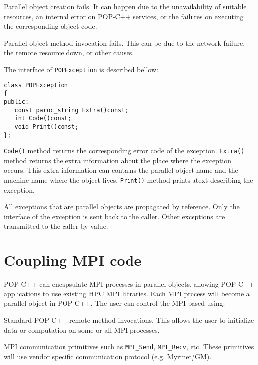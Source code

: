 \begin{petitem}

\item Parallel object creation fails. It can happen due to the
      unavailability of suitable resources, an internal error on POP-C++
      services, or the failures on executing the corresponding object
      code.

\item Parallel object method invocation fails. This can be due to the network
      failure, the remote resource down, or other causes.

\end{petitem}

The interface of \texttt{POPException} is described bellow:

\begin{verbatim}
class POPException
{
public:
   const paroc_string Extra()const;
   int Code()const;
   void Print()const;
};
\end{verbatim}

\texttt{Code()} method returns the corresponding error code of the exception.
\texttt{Extra()} method returns the extra information about the place where the
exception occurs. This extra information can contains the parallel object name
and the machine name where the object lives.
\texttt{Print()} method prints atext describing the exception.

All exceptions that are parallel objects are propagated by reference.
Only the interface of the exception is sent back to the caller. Other
exceptions are transmitted to the caller by value.



\section{Coupling MPI code} \label{sec:mpi}

POP-C++ can encapsulate MPI processes in parallel objects, allowing POP-C++ applications to use existing HPC MPI libraries. Each MPI process will become a parallel object in POP-C++. The user can control the MPI-based using:

\begin{petitem}

\item Standard POP-C++ remote method invocations. This allows the user to initialize data or computation on some or all MPI processes. 

\item MPI communication primitives such as \texttt{MPI\_Send}, \texttt{MPI\_Recv}, etc. These primitives will use vendor specific communication protocol (e.g. Myrinet/GM).  

\end{petitem}


